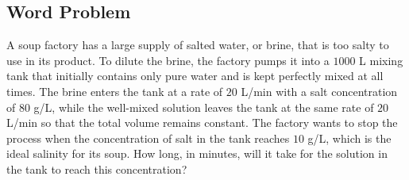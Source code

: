 \documentclass[10pt,letterpaper]{article}
\begin{document}
\subsection{Word Problem}
A soup factory has a large supply of salted water, or brine, that is too salty to use in its product. To dilute the brine, the factory pumps it into a $1000$ L mixing tank that initially contains only pure water and is kept perfectly mixed at all times. The brine enters the tank at a rate of $20$ L/min with a salt concentration of $80$ g/L, while the well-mixed solution leaves the tank at the same rate of $20$ L/min so that the total volume remains constant. The factory wants to stop the process when the concentration of salt in the tank reaches $10$ g/L, which is the ideal salinity for its soup. How long, in minutes, will it take for the solution in the tank to reach this concentration?
\end{document}
